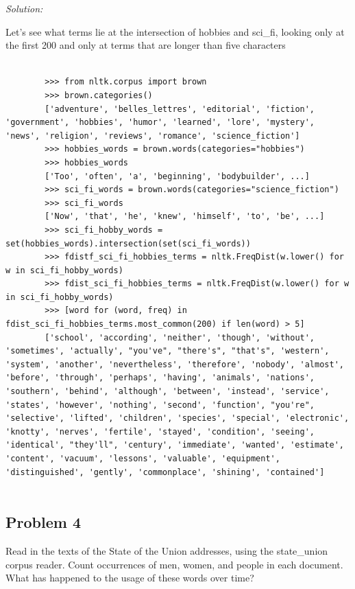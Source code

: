 \documentclass[11pt]{article}
\newenvironment{solution}{
	\vspace{10px}\noindent\emph{Solution:}
}{
	\vspace{10px}
}
\begin{document}
\begin{solution}
	
	Let's see what terms lie at the intersection of hobbies and sci\_fi, looking only at the first 200 and only at terms that are longer than five characters
	
	\begin{lstlisting}
	
		>>> from nltk.corpus import brown
		>>> brown.categories()
		['adventure', 'belles_lettres', 'editorial', 'fiction', 'government', 'hobbies', 'humor', 'learned', 'lore', 'mystery', 'news', 'religion', 'reviews', 'romance', 'science_fiction']
		>>> hobbies_words = brown.words(categories="hobbies")
		>>> hobbies_words
		['Too', 'often', 'a', 'beginning', 'bodybuilder', ...]
		>>> sci_fi_words = brown.words(categories="science_fiction")
		>>> sci_fi_words
		['Now', 'that', 'he', 'knew', 'himself', 'to', 'be', ...]
		>>> sci_fi_hobby_words = set(hobbies_words).intersection(set(sci_fi_words))
		>>> fdistf_sci_fi_hobbies_terms = nltk.FreqDist(w.lower() for w in sci_fi_hobby_words)
		>>> fdist_sci_fi_hobbies_terms = nltk.FreqDist(w.lower() for w in sci_fi_hobby_words)
		>>> [word for (word, freq) in fdist_sci_fi_hobbies_terms.most_common(200) if len(word) > 5]
		['school', 'according', 'neither', 'though', 'without', 'sometimes', 'actually', "you've", "there's", "that's", 'western', 'system', 'another', 'nevertheless', 'therefore', 'nobody', 'almost', 'before', 'through', 'perhaps', 'having', 'animals', 'nations', 'southern', 'behind', 'although', 'between', 'instead', 'service', 'states', 'however', 'nothing', 'second', 'function', "you're", 'selective', 'lifted', 'children', 'species', 'special', 'electronic', 'knotty', 'nerves', 'fertile', 'stayed', 'condition', 'seeing', 'identical', "they'll", 'century', 'immediate', 'wanted', 'estimate', 'content', 'vacuum', 'lessons', 'valuable', 'equipment', 'distinguished', 'gently', 'commonplace', 'shining', 'contained']
	
	\end{lstlisting}
	
\end{solution}  


\subsection*{Problem 4}
Read in the texts of the State of the Union addresses, using the state\_union corpus reader. Count occurrences of men, women, and people in each document. What has happened to the usage of these words over time?
\end{document}
